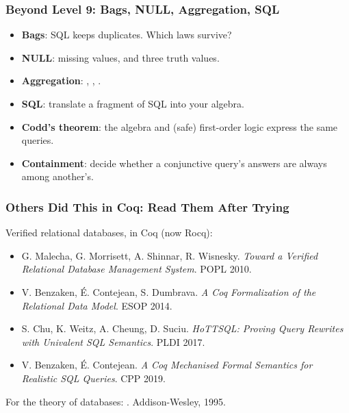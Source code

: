 \documentclass{ltx-talk}
\begin{document}
\begin{frame}
  \frametitle{Beyond Level 9: Bags, NULL, Aggregation, SQL}
  \begin{itemize}
    \item \textbf{Bags}: SQL keeps duplicates. Which laws survive?
    \item \textbf{NULL}: missing values, and three truth values.
    \item \textbf{Aggregation}: , ,
      .
    \item \textbf{SQL}: translate a fragment of SQL into your algebra.
    \item \textbf{Codd's theorem}: the algebra and (safe) first-order
      logic express the same queries.
    \item \textbf{Containment}: decide whether a conjunctive query's
      answers are always among another's.
  \end{itemize}
  \stretchtag
\end{frame}

\begin{frame}
  \frametitle{Others Did This in Coq: Read Them After Trying}
  Verified relational databases, in Coq (now Rocq):
  \begin{itemize}
    \item G. Malecha, G. Morrisett, A. Shinnar, R. Wisnesky. \emph{Toward a
      Verified Relational Database Management System}. POPL 2010.
    \item V. Benzaken, \'E. Contejean, S. Dumbrava. \emph{A Coq
      Formalization of the Relational Data Model}. ESOP 2014.
    \item S. Chu, K. Weitz, A. Cheung, D. Suciu. \emph{HoTTSQL: Proving
      Query Rewrites with Univalent SQL Semantics}. PLDI 2017.
    \item V. Benzaken, \'E. Contejean. \emph{A Coq Mechanised Formal
      Semantics for Realistic SQL Queries}. CPP 2019.
  \end{itemize}
  For the theory of databases: . Addison-Wesley, 1995.
\end{frame}
\end{document}
